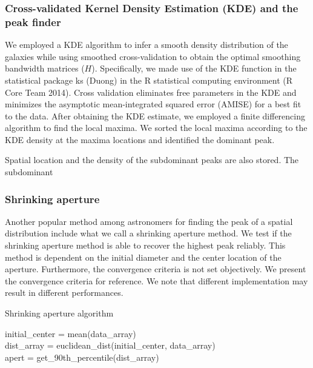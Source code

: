 \documentclass[letterpaper,useAMS,usenatbib]{mn2e}
\begin{document}
\subsubsection{Cross-validated Kernel Density Estimation (KDE) and the peak finder} 
We employed a KDE algorithm to infer a smooth density distribution of the
galaxies while using smoothed cross-validation to obtain the optimal smoothing
bandwidth matrices ($H$). Specifically, we made use of the KDE function in
the statistical package ks (Duong) in the R statistical computing environment (R Core Team 2014).
Cross validation eliminates free parameters in the KDE and minimizes
the asymptotic mean-integrated squared error (AMISE) for a best fit to the
data.
After obtaining the KDE estimate, we employed a finite differencing algorithm
to find the local maxima. We sorted the local maxima according to the KDE
density at the maxima locations and identified the dominant peak. 

Spatial location and the density of the subdominant peaks are also stored.
The subdominant 

\subsubsection{Shrinking aperture}
Another popular method among astronomers for finding the peak of a spatial
distribution include what we call a shrinking aperture method.
We test if the shrinking aperture method is able to recover the highest peak reliably.
This method is dependent on the initial diameter and the center location of the aperture.
Furthermore, the convergence criteria is not set objectively. We present the
convergence criteria for reference. We note that different implementation may result in
different performances.
\begin{algorithm}
	\caption{Shrinking aperture algorithm}
	 \hrulefill

	initial_center = mean(data\_array)\\
 	dist\_array = euclidean_dist(initial_center, data_array)\\
 	apert = get\_90th\_percentile(dist\_array)\\ 
	   \hrulefill
 \end{algorithm}
\end{document}
